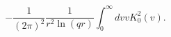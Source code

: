 \begin{equation}
-\frac1{(2\pi)^2}\frac1{r^2\ln(qr)}\int_0^{\infty} dv v K^2_0(v).
\label{41}
\end{equation}

